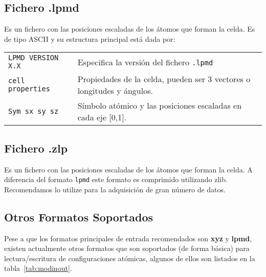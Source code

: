 \subsection{Fichero .lpmd}

Es un fichero con las posiciones escaladas de los \'atomos que forman la celda. Es de tipo ASCII y su estructura principal est\'a dada por:

\begin{center}
 \begin{tabular}{l|l}
 \verb|LPMD VERSION X.X | & Especifica la versi\'on del fichero \verb|.lpmd| \\
 \verb|cell properties | & Propiedades de la celda, pueden ser 3 vectores o longitudes y \'angulos. \\
 \verb|Sym sx sy sz| & S\'imbolo at\'omico y las posiciones escaladas en cada eje [0,1].\\
\end{tabular}
\end{center}

\subsection{Fichero .zlp}

Es un fichero con las posiciones escaladas de los \'atomos que forman la celda. A diferencia del formato \verb|lpmd| este formato es comprimido utilizando zlib. Recomendamos lo utilize para la adquisici\'on de gran n\'umero de datos.

\subsection{Otros Formatos Soportados}

Pese a que los formatos principales de entrada recomendados son \textbf{xyz} y \textbf{lpmd}, existen actualmente otros formatos que son soportados (de forma b\'asica) para lectura/escritura de configuraciones at\'omicas, algunos de ellos son listados en la tabla~\ref{tab:modinout}.


